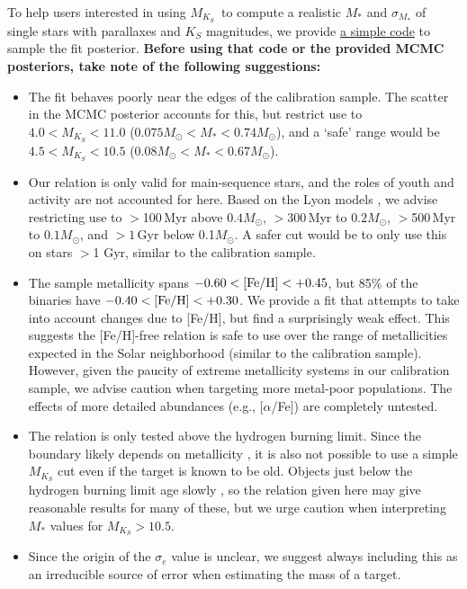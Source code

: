 \documentclass[twocolumn]{aastex62}
\newcommand{\mks}{$M_{K_S}$}
\begin{document}
To help users interested in using \mks\ to compute a realistic $M_*$ and $\sigma_{M_*}$ of single stars with parallaxes and $K_S$ magnitudes, we provide \href{https://github.com/awmann/M_-M_K-}{a simple code} to sample the fit posterior. {\bf Before using that code or the provided MCMC posteriors, take note of the following suggestions:}
\begin{itemize}
\item The fit behaves poorly near the edges of the calibration sample. The scatter in the MCMC posterior accounts for this, but restrict use to $4.0<M_{K_S}<11.0$ ($0.075M_\odot<M_*<0.74M_\odot$), and a `safe' range would be $4.5<M_{K_S}<10.5$ ($0.08M_\odot<M_*<0.67M_\odot$). 

\item Our relation is only valid for main-sequence stars, and the roles of youth and activity are not accounted for here. Based on the Lyon models \citep{BHAC15}, we advise restricting use to $>$100\,Myr above $0.4M_\odot$, $>$300\,Myr to $0.2M_\odot$, $>$500\,Myr to $0.1M_\odot$, and $>1$\,Gyr below 0.1$M_\odot$. A safer cut would be to only use this on stars $>$1 Gyr, similar to the calibration sample. 

\item The sample metallicity spans $-0.60<\rm{[Fe/H]}<+0.45$, but 85\% of the binaries have $-0.40<\rm{[Fe/H]}<+0.30$. We provide a fit that attempts to take into account changes due to [Fe/H], but find a surprisingly weak effect. This suggests the [Fe/H]-free relation is safe to use over the range of metallicities expected in the Solar neighborhood (similar to the calibration sample). However, given the paucity of extreme metallicity systems in our calibration sample, we advise caution when targeting more metal-poor populations. The effects of more detailed abundances (e.g., [$\alpha$/Fe]) are completely untested.

\item The relation is only tested above the hydrogen burning limit. Since the boundary likely depends on metallicity \citep{2001RvMP...73..719B}, it is also not possible to use a simple $M_{K_S}$ cut even if the target is known to be old. Objects just below the hydrogen burning limit age slowly \citep{BHAC15}, so the relation given here may give reasonable results for many of these, but we urge caution when interpreting $M_*$ values for $M_{K_S}>10.5$. 

\item Since the origin of the $\sigma_e$ value is unclear, we suggest always including this as an irreducible source of error when estimating the mass of a target. 

\end{itemize}
\end{document}
